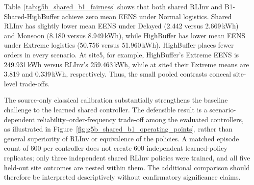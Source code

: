 \begin{revisedblock}
Table~\ref{tab:g5b_shared_b1_fairness} shows that both shared
RLInv and B1-Shared-HighBuffer achieve zero mean EENS under Normal
logistics. Shared RLInv has slightly lower mean EENS under Delayed
(2.442 versus 2.669\,kWh) and Monsoon (8.180 versus 8.949\,kWh),
while HighBuffer has lower mean EENS under Extreme logistics
(50.756 versus 51.960\,kWh). HighBuffer places fewer orders in
every scenario. At site5, for example, HighBuffer's Extreme EENS
is 249.931\,kWh versus RLInv's 259.463\,kWh, while at site4
their Extreme means are 3.819 and 0.339\,kWh, respectively.
Thus, the small pooled contrasts conceal site-level trade-offs.

The source-only classical calibration substantially strengthens the
baseline challenge to the learned shared controller. 
The defensible result is a scenario-dependent
reliability--order-frequency trade-off among the
evaluated controllers, as illustrated in
Figure~\ref{fig:g5b_shared_b1_operating_points},
rather than general superiority of RLInv or
equivalence of the policies.
 A matched episode count of 600 per controller does not create
600 independent learned-policy replicates; only three independent
shared RLInv policies were trained, and all five held-out site
outcomes are nested within them. The additional comparison should
therefore be interpreted descriptively without confirmatory
significance claims.
\end{revisedblock}

